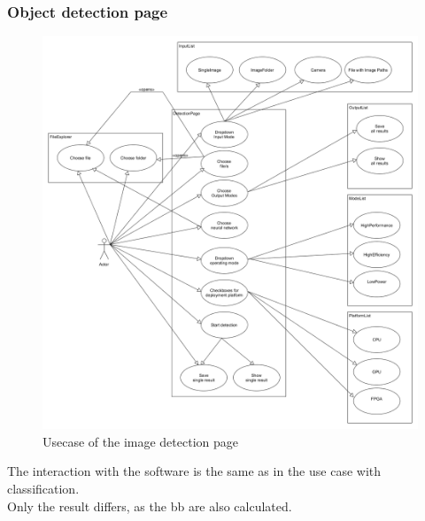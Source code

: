 \documentclass[parskip=full]{scrartcl}
\begin{document}
\subsubsection{Object detection page}
\begin{figure}[htb!]
\centering
\includegraphics[width=\textwidth]{objectDetectionUsecase}
\caption{Usecase of the image detection page}
\end{figure}
The interaction with the software is the same as in the use case with classification. \\
Only the result differs, as the \gls{bb} are also calculated.
\newpage
\end{document}
